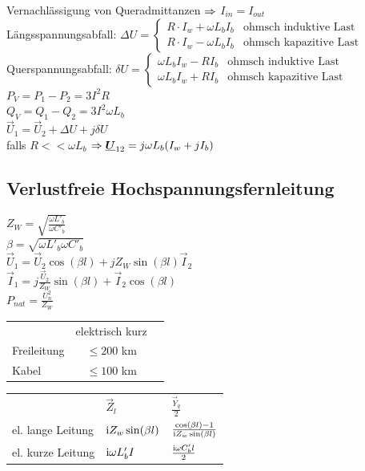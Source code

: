 \documentclass[fs, footer]{latex4ei}
\begin{document}
\begin{multicols}{4}
    Vernachlässigung von Queradmittanzen $\Rightarrow$ $I_{in} = I_{out}$\\
    Längsspannungsabfall: $\Delta U = \begin{cases} R \cdot I_w + \omega L_b I_b & \text{ohmsch induktive Last} \\ R \cdot I_w - \omega L_b I_b  & \text{ohmsch kapazitive Last} \end{cases} $\\
    Querspannungsabfall: $\delta U = \begin{cases} \omega L_b I_w - R I_b & \text{ohmsch induktive Last} \\ \omega L_b I_w + R I_b & \text{ohmsch kapazitive Last} \end{cases}$\\
    $P_V = P_1 - P_2 = 3 I^2 R$ \\
    $Q_V = Q_1 - Q_2 = 3 I^2 \omega L_b$ \\
    $\vec U_1 = \vec U_2 + \Delta U + j \delta U$ \\
    falls $R << \omega L_b$ \quad $\Rightarrow \underline{\boldsymbol {U}}_{12} = j \omega L_b (I_w + j I_b)$

    \subsection{Verlustfreie Hochspannungsfernleitung}


    $Z_W = \sqrt{\frac{\omega L'_b}{\omega C'_b}}$ \\
    $\beta = \sqrt{\omega L'_b \omega C'_b}$ \\
    $\vec U_1 = \vec U_2 \cos (\beta l) + j Z_W \sin (\beta l) \vec I_2$ \\
    $\vec I_1 = j \frac{\vec U_2}{Z_W} \sin (\beta l) + \vec I_2 \cos (\beta l)$ \\
    $P_{nat} = \frac{U_n^2}{Z_W}$ \\

    \begin{tabular}{lcc}
                    & elektrisch kurz \\
        Freileitung & $\le 200$ km    \\
        Kabel       & $\le 100$ km
    \end{tabular}


    \begin{tabular}{lll}
                          & $\vec Z_l$             & $\frac{\vec Y_q}{2}$                            \\[0.5em] \mrule
        el. lange Leitung & $\mathrm{i} Z_w \sin(\beta l)$ & $\frac{\cos(\beta l) -1}{\mathrm{i} Z_w \sin(\beta l)}$ \\[0.5em]
        el. kurze Leitung & $\mathrm{i} \omega L'_b I$     & $\frac{\mathrm{i} \omega C'_b l}{2}$                    \\[0.5em]
    \end{tabular}


\end{multicols}
\end{document}
